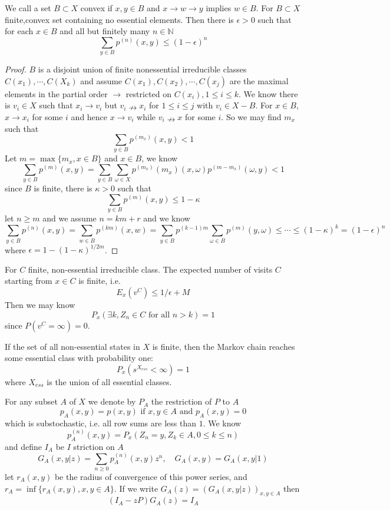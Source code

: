 \documentclass[lang=en, color=blue, ]{elegantbook}
\newcommand{\N}{\mathbb{N}}
\begin{document}
\begin{theorem}
    We call a set $B\subset X$ convex if $x,y \in B$ and $x\to w\to y$ implies $w\in B$. For $B\subset X$ finite,convex set containing no essential elements. Then there is $\epsilon > 0$ such that for each $x\in B$ and all but finitely many $n\in \N$
    \[
    \sum\limits_{y\in B}p^{(n)}(x,y) \leq (1-\epsilon)^n
    \]
\end{theorem}
\begin{proof}
    $B$ is a disjoint union of finite nonessential irreducible classes $C(x_1),\cdots,C(X_k)$ and assume $C(x_1),C(x_2),\cdots,C(x_j)$ are the maximal elements in the partial order $\to$ restricted on $C(x_i), 1\leq i\leq k$. We know there is $v_i \in X$ such that $x_i \to v_i$ but $v_i \nrightarrow x_i$ for $1\leq i \leq j$ with $v_i \in X - B$. For $x\in B$, $x\to x_i$ for some $i$ and hence $x\to v_i$ while $v_i \nrightarrow x$ for some $i$. So we may find $m_x$ such that
    \[\sum_{y\in B} p^{(m_x)}(x,y) < 1\]
    Let $ m = \max\{m_x, x\in B\}$ and $x\in B$, we know
    \[
    \sum\limits_{y\in B}p^{(m)}(x,y) = \sum\limits_{y\in B}\sum\limits_{\omega \in X}p^{(m_x)}(m_x)(x,\omega)p^{(m-m_x)}(\omega,y) < 1
    \]
    since $B$ is finite, there is $\kappa > 0$ such that
    \[
    \sum_{y\in B}p^{(m)}(x,y) \leq 1-\kappa
    \]
    let $n \geq m$ and we assume $n = km +r$ and we know
    \[
    \sum\limits_{y\in B}p^{(n)}(x,y) = \sum\limits_{w\in B}p^{(km)}(x,w) = \sum\limits_{y\in B}p^{(k-1)m}\sum\limits_{\omega \in B}p^{(m)}(y,\omega) \leq \cdots \leq (1-\kappa)^k = (1-\epsilon)^n
    \]
    where $\epsilon = 1 - (1-\kappa)^{1/2m}$.
\end{proof}

\begin{corollary}
    For $C$ finite, non-essential irreducible class. The expected number of visits $C$ starting from $x\in C$ is finite, i.e.
    \[
    E_x(v^C) \leq 1/\epsilon +M
    \]
    Then we may know
    \[P_x(\exists k, Z_n \in C\text{ for all }n>k) = 1\]
    since $P(v^C = \infty) = 0$.
\end{corollary}

\begin{corollary}
    If the set of all non-essential states in $X$ is finite, then the Markov chain reaches some essential class with probability one:
    \[P_x(s^{X_{ess}}<\infty) = 1\]
    where $X_{ess}$ is the union of all essential classes.
\end{corollary}

\begin{definition}
    For any subset $A$ of $X$ we denote by $P_A$ the restriction of $P$ to $A$
    \[
    p_A(x,y) = p(x,y)\text{ if }x,y\in A\text{ and }p_A(x,y) = 0
    \]
    which is substochastic, i.e. all row sums are less than $1$. We know
    \[
    p_A^{(n)}(x,y) = P_x(Z_n = y, Z_k \in A, 0\leq k\leq n)
    \]
    and define $I_A$ be $I$ striction on $A$
    \[
    G_A(x,y|z) = \sum_{n\geq 0} p_A^{(n)}(x,y)z^n,\quad G_A(x,y) = G_A(x,y|1)
    \]
    let $r_A(x,y)$ be the radius of convergence of this power series, and $r_A = \inf\{r_A(x,y), x,y\in A\}$. If we write $G_A(z) = (G_A(x,y|z))_{x,y\in A}$ then
    \[
    (I_A - zP)G_A(z) = I_A
    \]
\end{definition}
\end{document}
